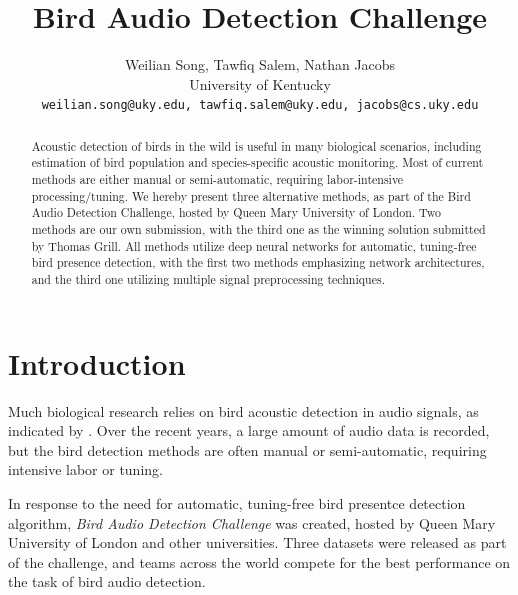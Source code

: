 \documentclass[10pt,twocolumn,letterpaper]{article}
\begin{document}
\title{Bird Audio Detection Challenge}

\author{
	Weilian Song, Tawfiq Salem, Nathan Jacobs\\ 
	University of Kentucky\\ 
	{\tt\small weilian.song@uky.edu, tawfiq.salem@uky.edu, jacobs@cs.uky.edu}
}


\maketitle

\begin{abstract}  

	Acoustic detection of birds in the wild is useful in many biological
	scenarios, including estimation of bird population and species-specific
	acoustic monitoring. Most of current methods are either manual or
	semi-automatic, requiring labor-intensive processing/tuning. We hereby
	present three alternative methods, as part of the Bird Audio Detection
	Challenge, hosted by Queen Mary University of London. Two methods are our
	own submission, with the third one as the winning solution submitted by
	Thomas Grill. All methods utilize deep neural networks for automatic,
	tuning-free bird presence detection, with the first two methods
	emphasizing network architectures, and the third one utilizing multiple
	signal preprocessing techniques.

\end{abstract}

\section{Introduction}

Much biological research relies on bird acoustic detection in audio signals,
as indicated by \cite{bad}. Over the recent years, a large amount of audio
data is recorded, but the bird detection methods are often manual or
semi-automatic, requiring intensive labor or tuning.

In response to the need for automatic, tuning-free bird presentce detection
algorithm, \textit{Bird Audio Detection Challenge} was created, hosted by
Queen Mary University of London and other universities. Three datasets were
released as part of the challenge, and teams across the world compete for
the best performance on the task of bird audio detection.
\end{document}
